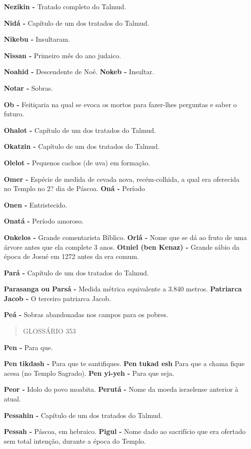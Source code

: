 \textbf{Nezikin -} Tratado completo do Tal­mud.

\textbf{Nidá -} Capítulo de um dos tratados do Talmud.

\textbf{Nikebu -} Insultaram.

\textbf{Nissan -} Primeiro mês do ano judai­co.

\textbf{Noahid -} Descendente de Noé. \textbf{Nokeb -} Insultar.

\textbf{Notar -} Sobras.

\textbf{Ob -} Feitiçaria na qual se evoca os mor­tos para fazer-lhes
perguntas e saber o futuro.

\textbf{Ohalot -} Capítulo de um dos tratados do Talmud.

\textbf{Okatzin -} Capítulo de um dos tratados do Talmud.

\textbf{Olelot -} Pequenos cachos (de uva) em formação.

\textbf{Omer -} Espécie de medida de cevada nova, recém-colhida, a qual
era ofere­cida no Templo no 2? dia de Páscoa. \textbf{Oná -} Período

\textbf{Onen -} Entristecido.

\textbf{Onatá -} Período amoroso.

\textbf{Onkelos -} Grande comentarista Bíblico. \textbf{Orlá -} Nome que
se dá ao fruto de uma árvore antes que ela complete 3 anos.
\textbf{Otniel (ben Kenaz) -} Grande sábio da época de Josué em 1272
antes da era comum.

\textbf{Pará -} Capítulo de um dos tratados do Talmud.

\textbf{Parasanga ou Parsá -} Medida métri­ca equivalente a 3.840
metros. \textbf{Patriarca Jacob -} O terceiro patriar­ca Jacob.

\textbf{Peá -} Sobras abandonadas nos campos para os pobres.

\begin{quote}
GLOSSÁRIO 353
\end{quote}

\textbf{Pen -} Para que.

\textbf{Pen tikdash -} Para que te santifiques. \textbf{Pen tukad esh}
Para que a chama fi­que acesa (no Templo Sagrado). \textbf{Pen yi-yeh -}
Para que seja.

\textbf{Peor -} Idolo do povo moabita. \textbf{Perutá -} Nome da moeda
israelense anterior à atual.

\textbf{Pessahin -} Capítulo de um dos trata­dos do Talmud.

\textbf{Pessah -} Páscoa, em hebraico. \textbf{Pigul -} Nome dado ao
sacrifício que era ofertado sem total intenção, duran­te a época do
Templo.

